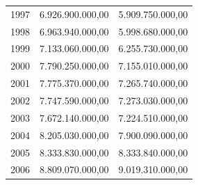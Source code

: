 \documentclass[a4paper,openright,12pt]{book}
\begin{document}
\begin{table}[]
\begin{tabular}{@{}lll@{}}
1997 & 6.926.900.000,00                                                                                                      & 5.909.750.000,00                                                                                                      \\
1998 & 6.963.940.000,00                                                                                                      & 5.998.680.000,00                                                                                                      \\
1999 & 7.133.060.000,00                                                                                                      & 6.255.730.000,00                                                                                                      \\
2000 & 7.790.250.000,00                                                                                                      & 7.155.010.000,00                                                                                                      \\
2001 & 7.775.370.000,00                                                                                                      & 7.265.740.000,00                                                                                                      \\
2002 & 7.747.590.000,00                                                                                                      & 7.273.030.000,00                                                                                                      \\
2003 & 7.672.140.000,00                                                                                                      & 7.224.510.000,00                                                                                                      \\
2004 & 8.205.030.000,00                                                                                                      & 7.900.090.000,00                                                                                                      \\
2005 & 8.333.830.000,00                                                                                                      & 8.333.840.000,00                                                                                                      \\
2006 & 8.809.070.000,00                                                                                                      & 9.019.310.000,00                                                                                                      \\

\end{tabular}
\end{table}
\end{document}
